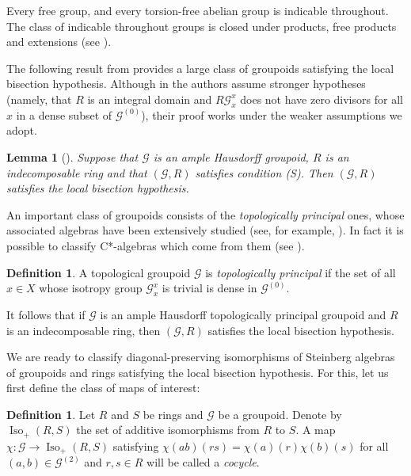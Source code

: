\documentclass[letter,11pt]{amsart}
\theoremstyle{plain}		\newtheorem{theorem}[generalnumbering]{Theorem}
\theoremstyle{plain}		\newtheorem{corollary}[generalnumbering]{Corollary}
\theoremstyle{definition}		\newtheorem{definition}[generalnumbering]{Definition}
\theoremstyle{definition}		\newtheorem{example}[generalnumbering]{Example}
\theoremstyle{plain}		\newtheorem{proposition}[generalnumbering]{Proposition}
\theoremstyle{plain}		\newtheorem{lemma}[generalnumbering]{Lemma}
\theoremstyle{plain}    \newtheorem{plainstyle}[generalnumbering]{\namefordifferentenvironment}
\theoremstyle{plain}    \newtheorem*{plainstyle*}{\namefordifferentenvironment}
\theoremstyle{definition}    \newtheorem{definitionstyle}[generalnumbering]{\namefordifferentenvironment}
\theoremstyle{definition}    \newtheorem*{definitionstyle*}{\namefordifferentenvironment}
\begin{document}
Every free group, and every torsion-free abelian group is indicable throughout. The class of indicable throughout groups is closed under products, free products and extensions (see \cite{MR0002137}).

The following result from \cite{carlsenrout2017} provides a large class of groupoids satisfying the local bisection hypothesis. Although in \cite{carlsenrout2017} the authors assume stronger hypotheses (namely, that $R$ is an integral domain and $R\mathcal{G}_x^x$ does not have zero divisors for all $x$ in a dense subset of $\mathcal{G}^{(0)}$), their proof works under the weaker assumptions we adopt.

\begin{lemma}[{\cite[Lemma 3.5(2)]{carlsenrout2017}}]\label{lemmanormalizerssteinbergalgebradiagonal2}
	Suppose that $\mathcal{G}$ is an ample Hausdorff groupoid, $R$ is an indecomposable ring and that $(\mathcal{G},R)$ satisfies condition (S). Then $(\mathcal{G},R)$ satisfies the local bisection hypothesis.
\end{lemma}

An important class of groupoids consists of the \emph{topologically principal} ones, whose associated algebras have been extensively studied (see, for example, \cite{MR3189105,MR2745642,MR1681679,MR2590626}). In fact it is possible to classify C*-algebras which come from them (see \cite{MR2460017}).

\begin{definition}\label{definitiontopologicallyprincipal}
	A topological groupoid $\mathcal{G}$ is \emph{topologically principal} if the set of all $x\in X$ whose isotropy group $\mathcal{G}_x^x$ is trivial is dense in $\mathcal{G}^{(0)}$.
\end{definition}

It follows that if $\mathcal{G}$ is an ample Hausdorff topologically principal groupoid and $R$ is an indecomposable ring, then $(\mathcal{G},R)$ satisfies the local bisection hypothesis.

We are ready to classify diagonal-preserving isomorphisms of Steinberg algebras of groupoids and rings satisfying the local bisection hypothesis. For this, let us first define the class of maps of interest:

\begin{definition}\label{definitioncocycle}
	Let $R$ and $S$ be rings and $\mathcal{G}$ be a groupoid. Denote by $\operatorname{Iso}_+(R,S)$ the set of additive isomorphisms from $R$ to $S$. A map $\chi\colon\mathcal{G}\to\operatorname{Iso}_+(R,S)$ satisfying $\chi(ab)(rs)=\chi(a)(r)\chi(b)(s)$ for all $(a,b)\in\mathcal{G}^{(2)}$ and $r,s\in R$ will be called a \emph{cocycle}.
\end{definition}
\end{document}
